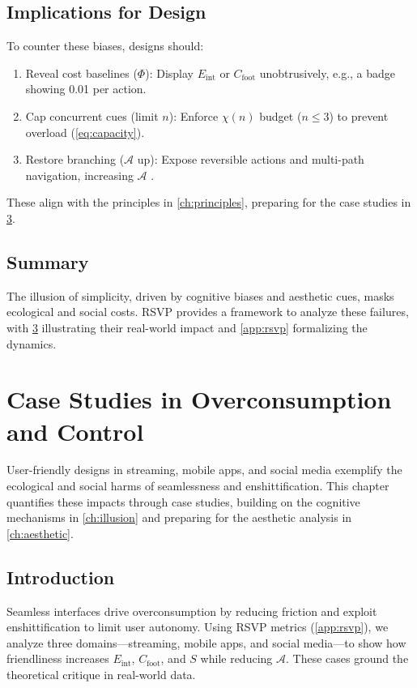 \documentclass[openany]{book}
\newcommand{\PhiS}{\Phi} %
\newcommand{\Sent}{S} %
\newcommand{\Eint}{E_{\mathrm{int}}} %
\newcommand{\Cfoot}{C_{\mathrm{foot}}} %
\newcommand{\Auton}{\mathcal{A}} %
\newcommand{\kWh}{\mathrm{kWh}}
\begin{document}
\section{Implications for Design}
\label{sec:illusion-implications}
To counter these biases, designs should:
\begin{enumerate}
  \item Reveal cost baselines ($\PhiS$): Display $\Eint$ or $\Cfoot$ unobtrusively, e.g., a badge showing \SI{0.01}{\kWh} per action.
  \item Cap concurrent cues (limit $n$): Enforce $\chi(n)$ budget ($n \leq 3$) to prevent overload (\cref{eq:capacity}).
  \item Restore branching ($\Auton$ up): Expose reversible actions and multi-path navigation, increasing $\Auton$ \citep{doctorow2022}.
\end{enumerate}
These align with the principles in \cref{ch:principles}, preparing for the case studies in \cref{ch:cases}.

\section{Summary}
The illusion of simplicity, driven by cognitive biases and aesthetic cues, masks ecological and social costs. RSVP provides a framework to analyze these failures, with \cref{ch:cases} illustrating their real-world impact and \cref{app:rsvp} formalizing the dynamics.

\chapter{Case Studies in Overconsumption and Control}
\label{ch:cases}

User-friendly designs in streaming, mobile apps, and social media exemplify the ecological and social harms of seamlessness and enshittification. This chapter quantifies these impacts through case studies, building on the cognitive mechanisms in \cref{ch:illusion} and preparing for the aesthetic analysis in \cref{ch:aesthetic}.

\section{Introduction}
\label{sec:cases-intro}
Seamless interfaces drive overconsumption by reducing friction and exploit enshittification to limit user autonomy. Using RSVP metrics (\cref{app:rsvp}), we analyze three domains---streaming, mobile apps, and social media---to show how friendliness increases $\Eint$, $\Cfoot$, and $\Sent$ while reducing $\Auton$. These cases ground the theoretical critique in real-world data.
\end{document}
